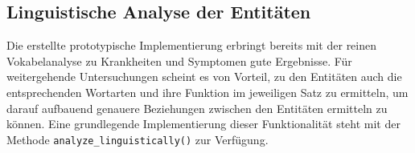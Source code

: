 \subsection{Linguistische Analyse der Entitäten}

Die erstellte prototypische Implementierung erbringt bereits mit der reinen Vokabelanalyse zu Krankheiten und Symptomen gute Ergebnisse. Für weitergehende Untersuchungen scheint es von Vorteil, zu den Entitäten auch die entsprechenden Wortarten und ihre Funktion im jeweiligen Satz zu ermitteln, um darauf aufbauend genauere Beziehungen zwischen den Entitäten ermitteln zu können. Eine grundlegende Implementierung dieser Funktionalität steht mit der Methode \lstinline{analyze_linguistically()} zur Verfügung.


